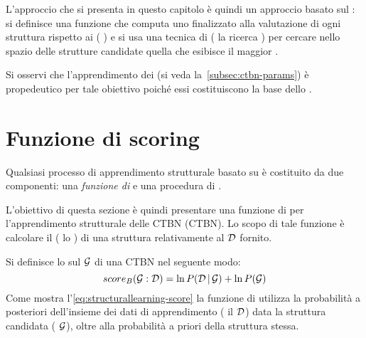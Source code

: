 L'approccio che si presenta in questo capitolo è quindi un approccio basato sul : si definisce una funzione che computa uno \emph{} finalizzato alla valutazione di ogni struttura rispetto ai  (\ie{} \emph{\keyword{\trs{}}}) e si usa una tecnica di  (\eg{} la ricerca \emph{\keyword{\hc{}}}) per cercare nello spazio delle strutture candidate quella che esibisce il maggior .

Si osservi che l'apprendimento dei  (si veda la~\autoref{subsec:ctbn-params}) è propedeutico per tale obiettivo poiché essi costituiscono la base dello .

\section{Funzione di scoring}\label{sec:ctbn-structurallearning-score}
Qualsiasi processo di apprendimento strutturale basato su  è costituito da due componenti: una \emph{funzione di } e una procedura di .

L'obiettivo di questa sezione è quindi presentare una funzione di  per l'apprendimento strutturale delle \acl{CTBN} (\acs{CTBN}). Lo scopo di tale funzione è calcolare il  (\ie{} lo ) di una struttura relativamente al \emph{\keyword{\trs{}}} $\mathcal{D}$ fornito.

Si definisce lo \emph{} sul  $\mathcal{G}$ di una \acs{CTBN} nel seguente modo:
\begin{equation}\label{eq:structurallearning-score}
score_B(\mathcal{G}:\mathcal{D})=\ln{P(\mathcal{D}\,\arrowvert\,\mathcal{G})} + \ln{P(\mathcal{G})}
\end{equation}
Come mostra l'\autoref{eq:structurallearning-score} la funzione di  utilizza la probabilità a posteriori dell'insieme dei dati di apprendimento (\ie{} il \trs{} $\mathcal{D}$) data la struttura candidata (\ie{} $\mathcal{G}$), oltre alla probabilità a priori della struttura stessa.

